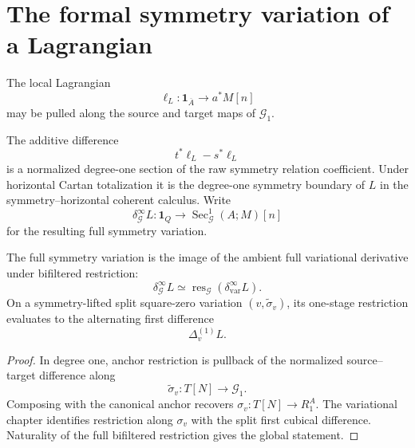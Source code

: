 \section{The formal symmetry variation of a Lagrangian}
\label{sec:symmetry-noether-the-formal-symmetry-variation-of-a-lagrangian}

The local Lagrangian
\[
\ell_L:\mathbf 1_{\overline A}\longrightarrow a^*M[n]
\]
may be pulled along the source and target maps of $\mathcal G_1$.

\begin{construction}
\label{constr:symmetry-noether-raw-symmetry-difference}
The additive difference
\[
t^*\ell_L-s^*\ell_L
\]
is a normalized degree-one section of the raw symmetry relation coefficient.  Under
horizontal Cartan totalization it is the degree-one symmetry boundary of $L$ in the
symmetry--horizontal coherent calculus.  Write
\[
\delta_{\mathcal G}^{\infty}L
:
\mathbf1_Q\longrightarrow
\operatorname{Sec}_{\mathcal G}^{1}(A;M)[n]
\]
for the resulting full symmetry variation.
\end{construction}

\begin{proposition}
\label{prop:symmetry-noether-restriction-from-the-ambient-variational-differential}
The full symmetry variation is the image of the ambient full variational derivative
under bifiltered restriction:
\[
\delta_{\mathcal G}^{\infty}L
\simeq
\operatorname{res}_{\mathcal G}
\left(
\delta_{\mathrm{var}}^{\infty}L
\right).
\]
On a symmetry-lifted split square-zero variation
$(v,\widetilde\sigma_v)$, its one-stage restriction evaluates to the alternating
first difference
\[
\Delta_v^{(1)}L.
\]
\end{proposition}

\begin{proof}
In degree one, anchor restriction is pullback of the normalized source--target
difference along
\[
\widetilde\sigma_v:T[N]\longrightarrow\mathcal G_1.
\]
Composing with the canonical anchor recovers
$\sigma_v:T[N]\to R^A_1$.  The variational chapter identifies restriction along
$\sigma_v$ with the split first cubical difference.  Naturality of the full
bifiltered restriction gives the global statement.
\end{proof}


